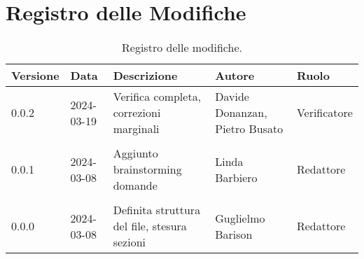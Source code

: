 \section*{Registro delle Modifiche}
\begin{table}[ht!]	
		\centering
		\begin{tabular}{ p{1.2cm} p{2cm} p{6cm} p{3cm} p{2cm}}
			\toprule
			\textbf{Versione}& \textbf{Data} & \textbf{Descrizione} & \textbf{Autore} & \textbf{Ruolo} \\
			\midrule
			0.0.2 & 2024-03-19 & Verifica completa, correzioni marginali & Davide Donanzan, Pietro Busato & Verificatore \\\\
			0.0.1 & 2024-03-08 & Aggiunto brainstorming domande & Linda Barbiero &
			Redattore \\\\ %
			0.0.0 & 2024-03-08 & Definita struttura del file, stesura sezioni & Guglielmo Barison & Redattore \\
			\bottomrule
		\end{tabular}
		\caption{Registro delle modifiche.}
		\label{table:Registro delle modifiche}
\end{table}
